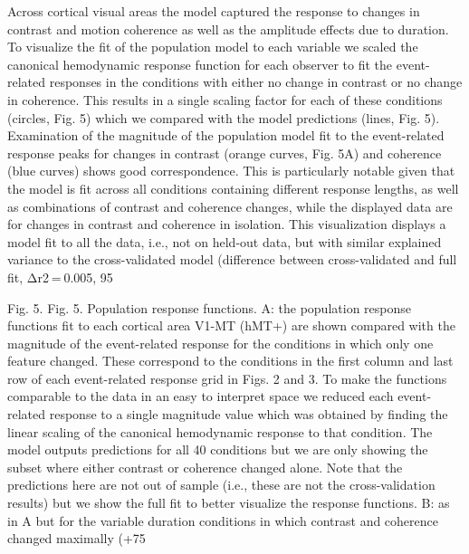 \documentclass{report}
\begin{document}
Across cortical visual areas the model captured the response to changes in contrast and motion coherence as well as the amplitude effects due to duration. To visualize the fit of the population model to each variable we scaled the canonical hemodynamic response function for each observer to fit the event-related responses in the conditions with either no change in contrast or no change in coherence. This results in a single scaling factor for each of these conditions (circles, Fig. 5) which we compared with the model predictions (lines, Fig. 5). Examination of the magnitude of the population model fit to the event-related response peaks for changes in contrast (orange curves, Fig. 5A) and coherence (blue curves) shows good correspondence. This is particularly notable given that the model is fit across all conditions containing different response lengths, as well as combinations of contrast and coherence changes, while the displayed data are for changes in contrast and coherence in isolation. This visualization displays a model fit to all the data, i.e., not on held-out data, but with similar explained variance to the cross-validated model (difference between cross-validated and full fit, Δr2 = 0.005, 95%

Fig. 5.
Fig. 5.
Population response functions. A: the population response functions fit to each cortical area V1-MT (hMT+) are shown compared with the magnitude of the event-related response for the conditions in which only one feature changed. These correspond to the conditions in the first column and last row of each event-related response grid in Figs. 2 and 3. To make the functions comparable to the data in an easy to interpret space we reduced each event-related response to a single magnitude value which was obtained by finding the linear scaling of the canonical hemodynamic response to that condition. The model outputs predictions for all 40 conditions but we are only showing the subset where either contrast or coherence changed alone. Note that the predictions here are not out of sample (i.e., these are not the cross-validation results) but we show the full fit to better visualize the response functions. B: as in A but for the variable duration conditions in which contrast and coherence changed maximally (+75%
\end{document}
